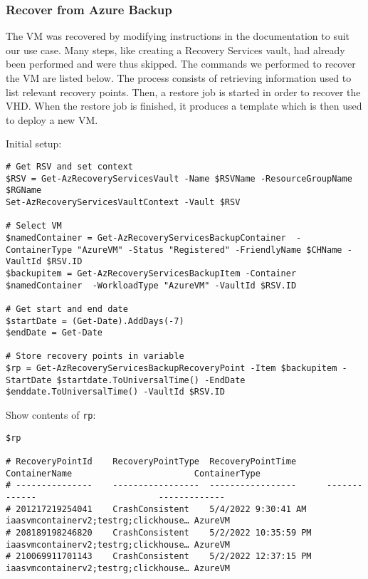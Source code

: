 \subsubsection{Recover from Azure Backup}
\label{sec:orgd58c2f9}
The VM was recovered by modifying instructions in the documentation \cite{v-amallick_back_nodate-1}
to suit our use case.
Many steps, like creating a Recovery Services vault, had already been performed and were thus skipped.
The commands we performed to recover the VM are listed below.
The process consists of retrieving information used to list relevant recovery points.
Then, a restore job is started in order to recover the VHD.
When the restore job is finished,
it produces a template which is then used to deploy a new VM.

Initial setup:
\begin{verbatim}
# Get RSV and set context
$RSV = Get-AzRecoveryServicesVault -Name $RSVName -ResourceGroupName $RGName
Set-AzRecoveryServicesVaultContext -Vault $RSV

# Select VM
$namedContainer = Get-AzRecoveryServicesBackupContainer  -ContainerType "AzureVM" -Status "Registered" -FriendlyName $CHName -VaultId $RSV.ID
$backupitem = Get-AzRecoveryServicesBackupItem -Container $namedContainer  -WorkloadType "AzureVM" -VaultId $RSV.ID

# Get start and end date
$startDate = (Get-Date).AddDays(-7)
$endDate = Get-Date

# Store recovery points in variable
$rp = Get-AzRecoveryServicesBackupRecoveryPoint -Item $backupitem -StartDate $startdate.ToUniversalTime() -EndDate $enddate.ToUniversalTime() -VaultId $RSV.ID
\end{verbatim}

Show contents of \texttt{rp}:
\begin{verbatim}
$rp

# RecoveryPointId    RecoveryPointType  RecoveryPointTime      ContainerName                        ContainerType
# ---------------    -----------------  -----------------      -------------                        -------------
# 201217219254041    CrashConsistent    5/4/2022 9:30:41 AM    iaasvmcontainerv2;testrg;clickhouse… AzureVM
# 208189198246820    CrashConsistent    5/2/2022 10:35:59 PM   iaasvmcontainerv2;testrg;clickhouse… AzureVM
# 210069911701143    CrashConsistent    5/2/2022 12:37:15 PM   iaasvmcontainerv2;testrg;clickhouse… AzureVM
\end{verbatim}

